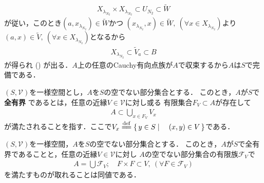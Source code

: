 \begin{prf}
		\begin{align}
			X_{\lambda_{N_2}} \times X_{\lambda_{N_2}} \subset U_{N_2} \subset \tilde{W}
		\end{align}
		が従い，このとき$(a,x_{\lambda_{N_2}}) \in \tilde{W}$かつ
		$(x_{\lambda_{N_2}},x) \in \tilde{W},\ (\forall x \in X_{\lambda_{N_2}})$より
		$(a,x) \in \tilde{V},\ (\forall x \in X_{\lambda_{N_2}})$となるから
		\begin{align}
			X_{\lambda_{N_2}} \subset \tilde{V}_a \subset B 
		\end{align}
		が得られ
()
		が出る．$A$上の任意のCauchy有向点族が$A$で収束するから$A$は$S$で完備である．
		\QED
	\end{prf}
	
	\begin{screen}
		\begin{dfn}[全有界]
			$(S,\mathscr{V})$を一様空間とし，$A$を$S$の空でない部分集合とする．
			このとき，$A$が$S$で{\bf 全有界}
			であるとは，任意の近縁$V \in \mathscr{V}$に対し或る
			有限集合$F_V \subset A$が存在して
			\begin{align}
				A \subset \bigcup_{x \in F_V} V_x
			\end{align}
			が満たされることを指す．ここで$V_x \defeq \Set{y \in S}{(x,y) \in V}$である．
		\end{dfn}
	\end{screen}
	
	\begin{screen}
		\begin{thm}[全有界性の同値条件]
		\label{thm:an_equivalent_condition_of_totally_boundedness}
			$(S,\mathscr{V})$を一様空間，$A$を$S$の空でない部分集合とする．
			このとき，$A$が$S$で全有界であることと，任意の近縁$V \in \mathscr{V}$に対し
			$A$の空でない部分集合の有限族$\mathscr{F}_V$で
			\begin{align}
				A = \bigcup \mathscr{F}_V;
				\quad F \times F \subset V,
				\ (\forall F \in \mathscr{F}_V)
				\label{eq:thm_an_equivalent_condition_of_totally_boundedness}
			\end{align}
			を満たすものが取れることは同値である．
		\end{thm}
	\end{screen}
	
